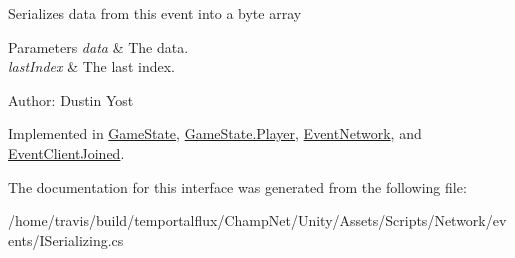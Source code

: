 Serializes data from this event into a byte array 


\begin{DoxyParams}{Parameters}
{\em data} & The data.\\
\hline
{\em last\-Index} & The last index.\\
\hline
\end{DoxyParams}


Author\-: Dustin Yost 

Implemented in \hyperlink{class_game_state_af57a06c77a763e8b57841bab79c9b12f}{Game\-State}, \hyperlink{struct_game_state_1_1_player_aa8df830f0a0bcfbfb263a634d125c3a5}{Game\-State.\-Player}, \hyperlink{class_event_network_ae2574cdc2bb836f3e41628ff1c095238}{Event\-Network}, and \hyperlink{class_event_client_joined_a10a9f8d247e3446fec1cc7a1eb13e6a0}{Event\-Client\-Joined}.



The documentation for this interface was generated from the following file\-:\begin{DoxyCompactItemize}
\item 
/home/travis/build/temportalflux/\-Champ\-Net/\-Unity/\-Assets/\-Scripts/\-Network/events/I\-Serializing.\-cs\end{DoxyCompactItemize}
